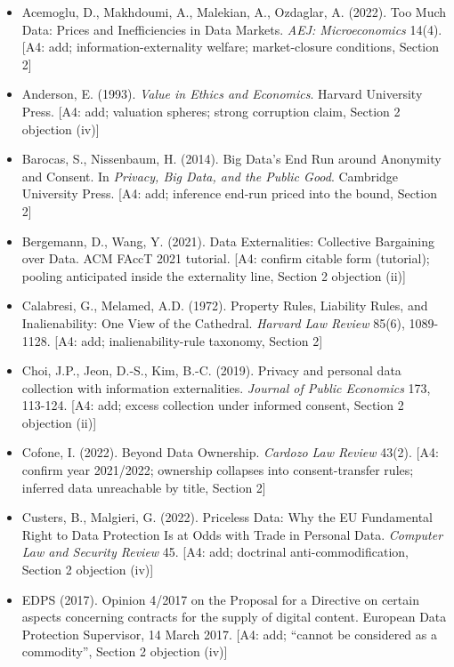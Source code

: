 \documentclass[
  11pt,
]{article}
\providecommand{\tightlist}{%
  \setlength{\itemsep}{0pt}\setlength{\parskip}{0pt}}
\begin{document}
\begin{itemize}
\tightlist
\item
  Acemoglu, D., Makhdoumi, A., Malekian, A., Ozdaglar, A. (2022). Too
  Much Data: Prices and Inefficiencies in Data Markets. \emph{AEJ:
  Microeconomics} 14(4). {[}A4: add; information-externality welfare;
  market-closure conditions, Section 2{]}
\item
  Anderson, E. (1993). \emph{Value in Ethics and Economics}. Harvard
  University Press. {[}A4: add; valuation spheres; strong corruption
  claim, Section 2 objection (iv){]}
\item
  Barocas, S., Nissenbaum, H. (2014). Big Data's End Run around
  Anonymity and Consent. In \emph{Privacy, Big Data, and the Public
  Good}. Cambridge University Press. {[}A4: add; inference end-run
  priced into the bound, Section 2{]}
\item
  Bergemann, D., Wang, Y. (2021). Data Externalities: Collective
  Bargaining over Data. ACM FAccT 2021 tutorial. {[}A4: confirm citable
  form (tutorial); pooling anticipated inside the externality line,
  Section 2 objection (ii){]}
\item
  Calabresi, G., Melamed, A.D. (1972). Property Rules, Liability Rules,
  and Inalienability: One View of the Cathedral. \emph{Harvard Law
  Review} 85(6), 1089-1128. {[}A4: add; inalienability-rule taxonomy,
  Section 2{]}
\item
  Choi, J.P., Jeon, D.-S., Kim, B.-C. (2019). Privacy and personal data
  collection with information externalities. \emph{Journal of Public
  Economics} 173, 113-124. {[}A4: add; excess collection under informed
  consent, Section 2 objection (ii){]}
\item
  Cofone, I. (2022). Beyond Data Ownership. \emph{Cardozo Law Review}
  43(2). {[}A4: confirm year 2021/2022; ownership collapses into
  consent-transfer rules; inferred data unreachable by title, Section
  2{]}
\item
  Custers, B., Malgieri, G. (2022). Priceless Data: Why the EU
  Fundamental Right to Data Protection Is at Odds with Trade in Personal
  Data. \emph{Computer Law and Security Review} 45. {[}A4: add;
  doctrinal anti-commodification, Section 2 objection (iv){]}
\item
  EDPS (2017). Opinion 4/2017 on the Proposal for a Directive on certain
  aspects concerning contracts for the supply of digital content.
  European Data Protection Supervisor, 14 March 2017. {[}A4: add;
  ``cannot be considered as a commodity'', Section 2 objection (iv){]}

\end{itemize}
\end{document}

